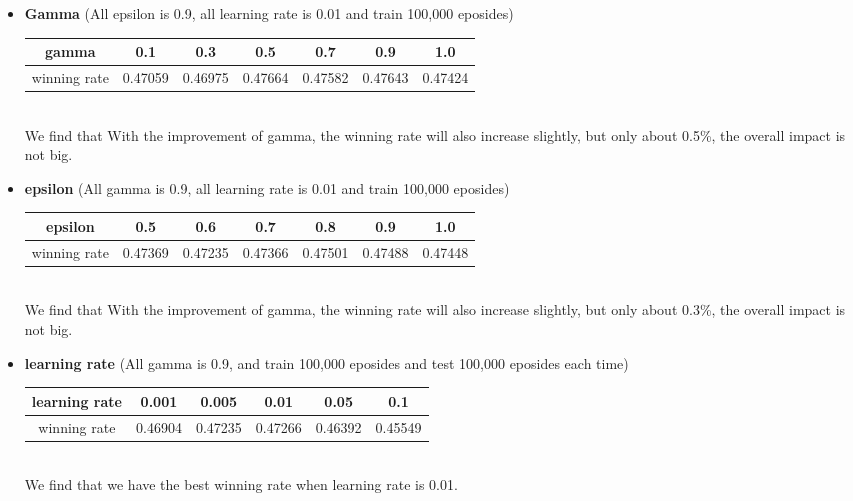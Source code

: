 \documentclass[12pt]{article}
\begin{document}
\begin{itemize}
  \item \textbf{Gamma} (All epsilon is 0.9, all learning rate is 0.01 and train 100,000 eposides)
  \begin{table}[!htbp]
    \centering
    \begin{tabular}{c|c|c|c|c|c|c}
      \hline
      gamma & 0.1 & 0.3 & 0.5 & 0.7 & 0.9 & 1.0 \\
      \hline
      winning rate & 0.47059 & 0.46975 & 0.47664 & 0.47582 & 0.47643 & 0.47424 \\   %
      \hline
    \end{tabular}
  \end{table}
  ~\\We find that With the improvement of gamma, the winning rate will also increase slightly, but only about 0.5\%, the overall impact is not big.
  
  \item \textbf{epsilon} (All gamma is 0.9, all learning rate is 0.01 and train 100,000 eposides)
  \begin{table}[!htbp]
    \centering
    \begin{tabular}{c|c|c|c|c|c|c}
      \hline
      epsilon & 0.5 & 0.6 & 0.7 & 0.8 & 0.9 & 1.0 \\
      \hline
      winning rate & 0.47369 & 0.47235 & 0.47366 & 0.47501 & 0.47488 & 0.47448 \\   %
      \hline
    \end{tabular}
  \end{table}
  ~\\We find that With the improvement of gamma, the winning rate will also increase slightly, but only about 0.3\%, the overall impact is not big.
  
  \item \textbf{learning rate} (All gamma is 0.9, and train 100,000 eposides and test 100,000 eposides each time)
  \begin{table}[!htbp]
    \centering
    \begin{tabular}{c|c|c|c|c|c}
      \hline
      learning rate & 0.001 & 0.005 & 0.01 & 0.05 & 0.1 \\
      \hline
      winning rate & 0.46904 & 0.47235 & 0.47266 & 0.46392 & 0.45549 \\   %
      \hline
    \end{tabular}
  \end{table}
  ~\\We find that we have the best winning rate when learning rate is 0.01.
  

\end{itemize}
\end{document}
